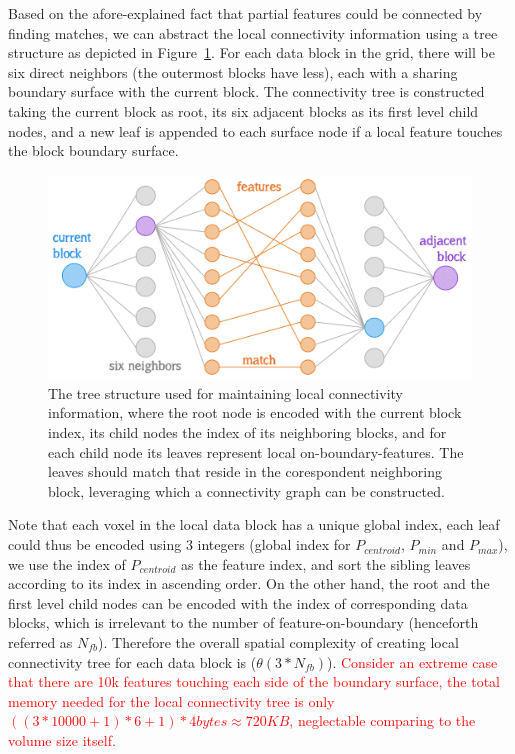 \documentclass[10pt, conference, compsocconf]{IEEEtran}
\begin{document}
Based on the afore-explained fact that partial features could be connected by finding matches, we can abstract the local connectivity information using a tree structure as depicted in Figure~\ref{fig:match}. For each data block in the grid, there will be six direct neighbors (the outermost blocks have less), each with a sharing boundary surface with the current block. The connectivity tree is constructed taking the current block as root, its six adjacent blocks as its first level child nodes, and a new leaf is appended to each surface node if a local feature touches the block boundary surface.

\begin{figure}[ht]
	\centering
	\includegraphics[width=1\linewidth]{match.png}
	\caption{The tree structure used for maintaining local connectivity information, where the root node is encoded with the current block index, its child nodes the index of its neighboring blocks, and for each child node its leaves represent local on-boundary-features. The leaves should match that reside in the corespondent neighboring block, leveraging which a connectivity graph can be constructed.}
	\label{fig:match}
\end{figure}

Note that each voxel in the local data block has a unique global index, each leaf could thus be encoded using 3 integers (global index for $P_{centroid}$, $P_{min}$ and $P_{max}$), we use the index of $P_{centroid}$ as the feature index, and sort the sibling leaves according to its index in ascending order. On the other hand, the root and the first level child nodes can be encoded with the index of corresponding data blocks, which is irrelevant to the number of feature-on-boundary (henceforth referred as $N_{fb}$). Therefore the overall spatial complexity of creating local connectivity tree for each data block is ($\theta(3*N_{fb})$). \textcolor{red}{Consider an extreme case that there are 10k features touching each side of the boundary surface, the total memory needed for the local connectivity tree is only $((3*10000 + 1)*6 + 1) * 4 bytes \approx 720KB$, neglectable comparing to the volume size itself.}
\end{document}
